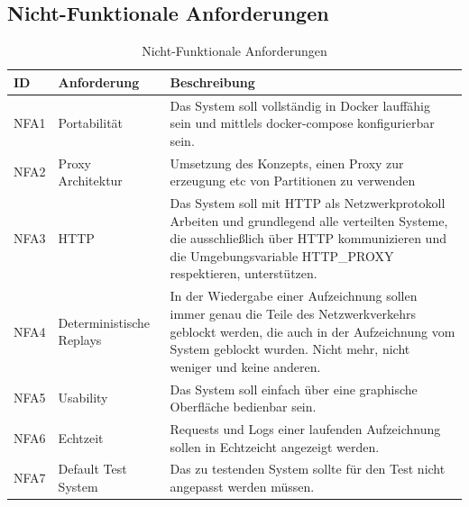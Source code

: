\documentclass[12pt,a4paper]{report}
\begin{document}
\subsection{Nicht-Funktionale Anforderungen}
\begin{table}[h]
	\centering
	\caption{Nicht-Funktionale Anforderungen}
	\label{tab:nfa}
	\begin{tabular}{|l|l|p{7cm}|}
		\hline
		ID   & Anforderung              & Beschreibung                                                                                                                                                                                                  \\ \hline
		NFA1 & Portabilität             & Das System soll vollständig in Docker lauffähig sein und mittlels docker-compose konfigurierbar sein.                                                                                                         \\ \hline
		NFA2 & Proxy Architektur        & Umsetzung des Konzepts, einen Proxy zur erzeugung etc von Partitionen zu verwenden                                                                                                                            \\ \hline
		NFA3 & HTTP                     & Das System soll mit HTTP als Netzwerkprotokoll Arbeiten und grundlegend alle verteilten Systeme, die ausschließlich über HTTP kommunizieren und die Umgebungsvariable HTTP\_PROXY respektieren, unterstützen. \\ \hline
		NFA4 & Deterministische Replays & In der Wiedergabe einer Aufzeichnung sollen immer genau die Teile des Netzwerkverkehrs geblockt werden, die auch in der Aufzeichnung vom System geblockt wurden. Nicht mehr, nicht weniger und keine anderen. \\ \hline
		NFA5 & Usability                & Das System soll einfach über eine graphische Oberfläche bedienbar sein.                                                                                                                                       \\ \hline
		NFA6 & Echtzeit                 & Requests und Logs einer laufenden Aufzeichnung sollen in Echtzeicht angezeigt werden.                                                                                                                         \\ \hline
		NFA7 & Default Test System      & Das zu testenden System sollte für den Test nicht angepasst werden müssen.                                                                                                                                    \\ \hline
	\end{tabular}
\end{table}
\end{document}
